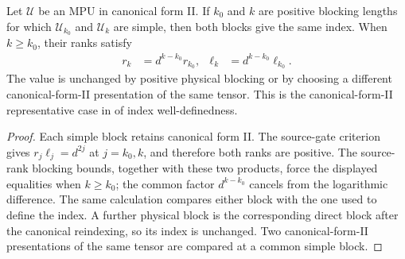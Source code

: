 \begin{lemma}
    \label{prop:mpu_admissible_index_well_defined}
    \leanok
    Let $\mathcal U$ be an MPU in canonical form II. If $k_0$ and $k$ are
    positive blocking lengths for which $\mathcal U_{k_0}$ and $\mathcal U_k$
    are simple, then both blocks give the same index. When $k\geq k_0$, their
    ranks satisfy
    \begin{align}
        r_k    & =d^{k-k_0}r_{k_0},    &
        \ell_k & =d^{k-k_0}\ell_{k_0}.
    \end{align}
    The value is unchanged by positive physical blocking or by choosing a
    different canonical-form-II presentation of the same tensor. This is the
    canonical-form-II representative case in
    \cite[Proposition~IV.2]{Cirac2017MPU} of index well-definedness.
\end{lemma}

\begin{proof}\leanok
    Each simple block retains canonical form II. The source-gate criterion
    gives $r_j\ell_j=d^{2j}$ at $j=k_0,k$, and therefore both ranks are
    positive. The source-rank blocking bounds, together with these two
    products, force the displayed equalities when $k\geq k_0$; the common
    factor $d^{k-k_0}$ cancels from the logarithmic difference. The same
    calculation compares either block with the one used to define the index.
    A further physical block is the corresponding direct block after the
    canonical reindexing, so its index is unchanged. Two canonical-form-II
    presentations of the same tensor are compared at a common simple block.
\end{proof}


